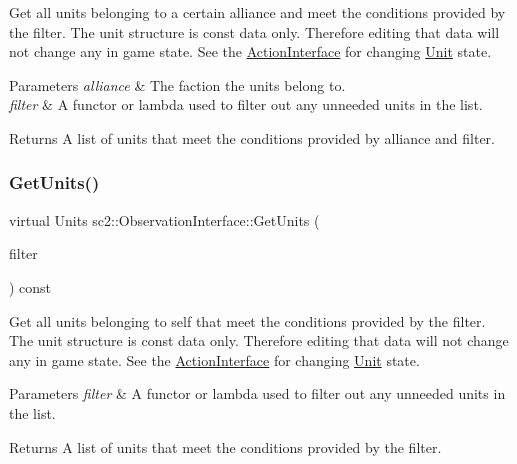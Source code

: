 Get all units belonging to a certain alliance and meet the conditions provided by the filter. The unit structure is const data only. Therefore editing that data will not change any in game state. See the \hyperlink{classsc2_1_1_action_interface}{Action\+Interface} for changing \hyperlink{classsc2_1_1_unit}{Unit} state. 
\begin{DoxyParams}{Parameters}
{\em alliance} & The faction the units belong to. \\
\hline
{\em filter} & A functor or lambda used to filter out any unneeded units in the list. \\
\hline
\end{DoxyParams}
\begin{DoxyReturn}{Returns}
A list of units that meet the conditions provided by alliance and filter. 
\end{DoxyReturn}
\mbox{\label{classsc2_1_1_observation_interface_ab0d22edc6bd276b8e9d27387294fdc88}} 
\subsubsection{\texorpdfstring{Get\+Units()}{GetUnits()}\hspace{0.1cm}{\footnotesize\ttfamily [3/3]}}
{\footnotesize\ttfamily virtual Units sc2\+::\+Observation\+Interface\+::\+Get\+Units (\begin{DoxyParamCaption}\item[{\hyperlink{sc2__interfaces_8h_a5cc3d9751182ccd2b085f3e272bcc88b}{Filter}}]{filter }\end{DoxyParamCaption}) const\hspace{0.3cm}{\ttfamily [pure virtual]}}

Get all units belonging to self that meet the conditions provided by the filter. The unit structure is const data only. Therefore editing that data will not change any in game state. See the \hyperlink{classsc2_1_1_action_interface}{Action\+Interface} for changing \hyperlink{classsc2_1_1_unit}{Unit} state. 
\begin{DoxyParams}{Parameters}
{\em filter} & A functor or lambda used to filter out any unneeded units in the list. \\
\hline
\end{DoxyParams}
\begin{DoxyReturn}{Returns}
A list of units that meet the conditions provided by the filter. 
\end{DoxyReturn}
\mbox{\label{classsc2_1_1_observation_interface_a30cdffc5d5c87797c5c154fe50bad768}} 
